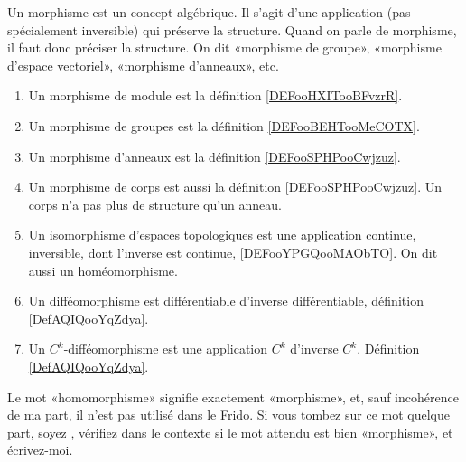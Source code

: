 	\label{THEMEooMorphismes}
Un morphisme est un concept algébrique. Il s'agit d'une application (pas spécialement inversible) qui préserve la structure. Quand on parle de morphisme, il faut donc préciser la structure. On dit «morphisme de groupe», «morphisme d'espace vectoriel», «morphisme d'anneaux», etc.
\begin{enumerate}
	\item
	      Un morphisme de module est la définition \ref{DEFooHXITooBFvzrR}.
	\item
	      Un morphisme de groupes est la définition \ref{DEFooBEHTooMeCOTX}.
	\item
	      Un morphisme d'anneaux est la définition \ref{DEFooSPHPooCwjzuz}.
	\item
	      Un morphisme de corps est aussi la définition \ref{DEFooSPHPooCwjzuz}. Un corps n'a pas plus de structure qu'un anneau.
	\item
	      Un isomorphisme d'espaces topologiques est une application continue, inversible, dont l'inverse est continue, \ref{DEFooYPGQooMAObTO}. On dit aussi un homéomorphisme.
	\item
	      Un difféomorphisme est différentiable d'inverse différentiable, définition \ref{DefAQIQooYqZdya}.
	\item
	      Un \( C^k\)-difféomorphisme est une application \( C^k\) d'inverse \( C^k\). Définition \ref{DefAQIQooYqZdya}.
\end{enumerate}

\begin{normaltext}		\label{NORMooTXFWooApjnOY}
	Le mot «homomorphisme» signifie exactement «morphisme», et, sauf incohérence de ma part, il n'est pas utilisé dans le Frido. Si vous tombez sur ce mot quelque part, soyez , vérifiez dans le contexte si le mot attendu est bien «morphisme», et écrivez-moi.
\end{normaltext}
